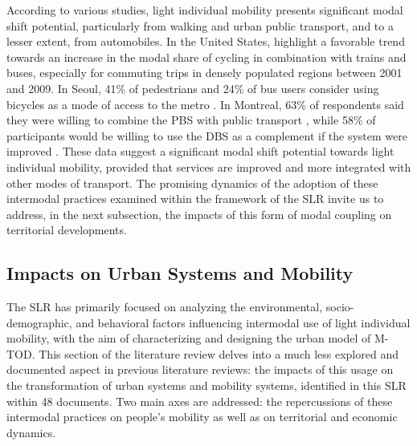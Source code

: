 \begin{refsegment}
According to various studies, light individual mobility presents significant modal shift potential, particularly from walking and urban public transport, and to a lesser extent, from automobiles. In the United States, \textcolor{blue}{\textcite[106]{wang_bicycle-transit_2013}} highlight a favorable trend towards an increase in the modal share of cycling in combination with trains and buses, especially for commuting trips in densely populated regions between 2001 and 2009. In Seoul, 41\% of pedestrians and 24\% of bus users consider using bicycles as a mode of access to the metro \textcolor{blue}{\autocite[982]{lee_bicycle-based_2016}}. In Montreal, 63\% of respondents said they were willing to combine the \acrshort{PBS} with public transport \textcolor{blue}{\autocite[111]{bachand-marleau_much-anticipated_2011}}, while 58\% of participants would be willing to use the \acrshort{DBS} as a complement if the system were improved \textcolor{blue}{\autocite[12]{fan_how_2019}}. These data suggest a significant modal shift potential towards light individual mobility, provided that services are improved and more integrated with other modes of transport. The promising dynamics of the adoption of these intermodal practices examined within the framework of the \acrshort{SLR} invite us to address, in the next subsection, the impacts of this form of modal coupling on territorial developments.%

\subsection{Impacts on Urban Systems and Mobility
    \label{chap2:impacts-systemes-urbain-mobilite}
    }

The \acrshort{SLR} has primarily focused on analyzing the environmental, socio-demographic, and behavioral factors influencing intermodal use of light individual mobility, with the aim of characterizing and designing the urban model of \acrshort{M-TOD}. This section of the literature review delves into a much less explored and documented aspect in previous literature reviews: the impacts of this usage on the transformation of urban systems and mobility systems, identified in this \acrshort{SLR} within 48 documents. Two main axes are addressed: the repercussions of these intermodal practices on people's mobility as well as on territorial and economic dynamics.%


\end{refsegment}
